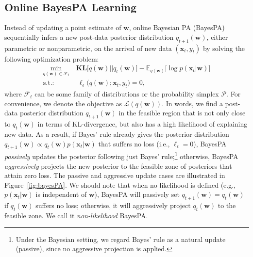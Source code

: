 \documentclass[twoside,11pt]{article}
\newcommand{\xv}{\bm{x}}
\newcommand{\wv}{\bm{w}}
\newcommand{\prob}{\mathcal{P}}
\newcommand{\KL}{\textbf{KL}}
\begin{document}
\subsection{Online BayesPA Learning}
Instead of updating a point estimate of $\bm{w}$, online Bayesian PA (BayesPA) sequentially infers a new post-data posterior distribution $q_{t+1}(\bm{w})$, either parametric or nonparametric, on the arrival of new data $(\xv_t, y_t)$ by solving the following optimization problem:
\setlength\arraycolsep{1pt} \begin{equation}\label{eq:onlinepa}
\begin{array}{rl}
\underset{q(\bm{w}) \in \mathcal{F}_t}{\operatorname{min}} & ~\KL\Big[q(\bm{w}) || q_{t}(\bm{w}) \Big]-\mathbb{E}_{q(\bm{w})}\Big[\log p(\bm{x}_t | \bm{w})\Big] \\
\text{s.t.:} &~~ \ell_\epsilon\Big(q(\bm{w}); \bm{x}_t, y_t\Big) = 0,
\end{array}
\end{equation}
where $\mathcal{F}_t$ can be some family of distributions or the probability simplex $\prob$. For convenience, we denote the objective as $\mathcal{L}(q(\wv))$. In words, we find a post-data posterior distribution $q_{t+1}(\bm{w})$ in the feasible region that is not only close to $q_t(\bm{w})$ in terms of KL-divergence, but also has a high likelihood of explaining new data. %
As a result, if Bayes' rule already gives the posterior distribution $q_{t+1}(\bm{w}) \propto q_{t}(\bm{w}) p(\bm{x}_t | \bm{w})$ that suffers no loss (i.e., $\ell_\epsilon = 0$), BayesPA \emph{passively} updates the posterior following just Bayes' rule;\footnote{Under the Bayesian setting, we regard Bayes' rule as a natural update (passive), since no aggressive projection is applied.} otherwise, BayesPA \emph{aggressively} projects the new posterior to the feasible zone of posteriors that attain zero loss. The passive and aggressive update cases are illustrated in Figure~\ref{fig:bayesPA}. We should note that when no likelihood is defined (e.g., $p(\xv_t|\wv)$ is independent of $\wv$), BayesPA will passively set $q_{t+1}(\wv) = q_t(\wv)$ if $q_t(\wv)$ suffers no loss; otherwise, it will aggressively project $q_t(\wv)$ to the feasible zone. We call it {\it non-likelihood} BayesPA.
\end{document}
